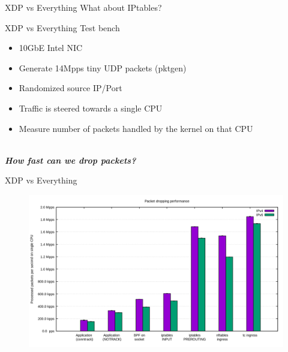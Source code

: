 \documentclass{beamer}
\begin{document}

\begin{frame}{XDP vs Everything}
  \Large{What about IPtables?}
\end{frame}

\begin{frame}{XDP vs Everything}
  Test bench
  \begin{itemize}
    \item 10GbE Intel NIC
    \item Generate 14Mpps tiny UDP packets (pktgen)
    \item Randomized source IP/Port
    \item Traffic is steered towards a single CPU
    \item Measure number of packets handled by the kernel on that CPU
  \end{itemize}

  \ \\
  \pause
  \textbf{\textit{How fast can we drop packets?}}
\end{frame}

\begin{frame}{XDP vs Everything}
  \begin{figure}
    \includegraphics[width=1.1\textwidth]{./no_xdp.png}
  \end{figure}
\end{frame}
\end{document}
